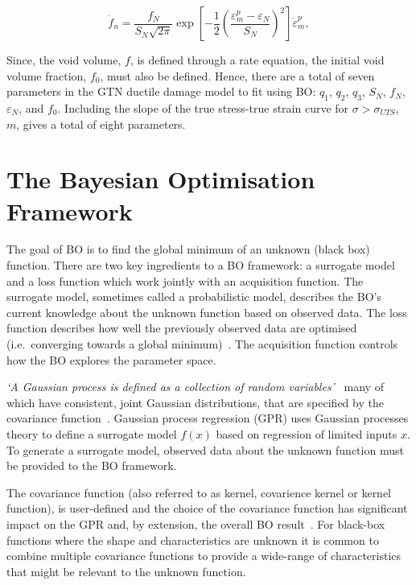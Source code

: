 \documentclass[preprint, review, 12pt]{elsarticle}
\begin{document}
	\begin{equation}
		\dot{f}_n = \frac{f_N}{S_N \sqrt{2\pi}} \exp \left[ -\frac{1}{2} \left( \frac{{\varepsilon}_m^p -\varepsilon_N}{S_N} \right) ^ 2 \right] \dot{\varepsilon}_m^p,
		\label{eq:void_nucleation}
	\end{equation}

	Since, the void volume, $f$, is defined through a rate equation, the initial void volume fraction, $f_0$, must also be defined.
	Hence, there are a total of seven parameters in the GTN ductile damage model to fit using BO: $q_1$, $q_2$, $q_3$, $S_N$, $f_N$, $\varepsilon_N$, and $f_0$.
	Including the slope of the true stress-true strain curve for $\sigma>\sigma_{UTS}$, $m$, gives a total of eight parameters.

	\section{The Bayesian Optimisation Framework}
	\label{h:general_bo}

	The goal of BO is to find the global minimum of an unknown (black box) function.
	There are two key ingredients to a BO framework: a surrogate model and a loss function which work jointly with an acquisition function.
	The surrogate model, sometimes called a probabilistic model, describes the BO's current knowledge about the unknown function based on observed data.
	The loss function describes how well the previously observed data are optimised (i.e.\ converging towards a global minimum)~\cite{SHAHRIARI2016}.
	The acquisition function controls how the BO explores the parameter space.

	\textit{`A Gaussian process is defined as a collection of random variables'}~\cite{RASMUSSEN2006} many of which have consistent, joint Gaussian distributions, that are specified by the covariance function~\cite{RASMUSSEN2004}.
	Gaussian process regression (GPR) uses Gaussian processes theory to define a surrogate model $f(x)$ based on regression of limited inputs $x$.
	To generate a surrogate model, observed data about the unknown function must be provided to the BO framework.

	The covariance function (also referred to as kernel, covarience kernel or kernel function), is user-defined and the choice of the covariance function has significant impact on the GPR and, by extension, the overall BO result~\cite{WANG2022}.
	For black-box functions where the shape and characteristics are unknown it is common to combine multiple covariance functions to provide a wide-range of characteristics that might be relevant to the unknown function.
\end{document}
